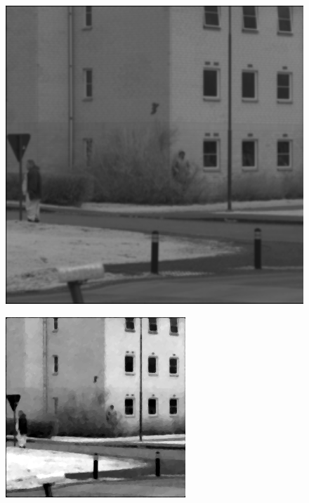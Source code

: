 \begin{figure}[H]
    \centering
\begin{minipage}[t]{0.32\textwidth}
    \includegraphics[width=1\textwidth]{result/dynamic/lum/intense_change_org.png}
    \subcaption{}
    \label{fig:lum_1}
\end{minipage}
\begin{minipage}[t]{0.32\textwidth}
    \includegraphics[width = \textwidth]{result/dynamic/lum/intense_change.png}

\end{minipage}
\end{figure}
